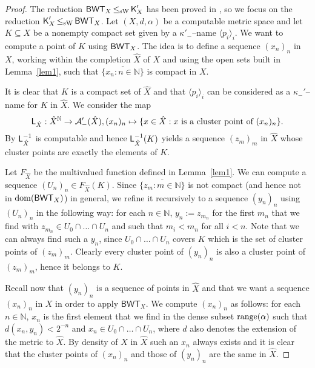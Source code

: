 \documentclass[a4paper]{amsart}
\def\AA{{\mathcal A}}
\def\IN{{\mathbb{N}}}
\def\dom{{\rm dom}}
\def\range{{\rm range}}
\def\BWT{\text{\rm\sffamily BWT}}
\def\K{\text{\rm\sffamily K}}
\def\L{\text{\rm\sffamily L}}
\def\leqSW{\mathop{\leq_{\mathrm{sW}}}}
\theoremstyle{definition}
\begin{document}
\begin{proof} The reduction $\BWT_X\leqSW\K'_X$ has been proved in \cite{BGM12},
so we focus on the reduction $\K'_X\leqSW\BWT_X$.
Let $(X,d,\alpha)$ be a computable metric space and let $K\subseteq X$ be a nonempty compact set given by a $\kappa'_-$--name $\langle p_i\rangle_i$.
We want to compute a point of $K$ using $\BWT_X$. The idea is to define a sequence $(x_n)_n$ in $X$,
working within the completion $\hat{X}$ of $X$ and using the open sets built in Lemma~\ref{lem1}, such that $\overline{\{x_n:n\in\IN\}}$ is compact in $X$.

It is clear that $K$ is a compact set of $\hat{X}$ and that $\langle p_i\rangle_i$ can be considered as a $\kappa_-'$--name for $K$ in $\hat{X}$.
We consider the map
\[\L_{\hat{X}}:\hat{X}^\IN\to\AA'_-(\hat{X}),(x_n)_n\mapsto\{x\in \hat{X}:\mbox{$x$ is a cluster point of $(x_n)_n$}\}.\]
By \cite[Corollary 9.5]{BGM12} $\L^{-1}_{\hat{X}}$ is computable and hence $\L_{\hat{X}}^{-1}(K)$ yields a sequence
$(z_m)_m$ in $\hat{X}$ whose cluster points are exactly the elements of $K$.

Let $F_{\hat{X}}$ be the multivalued function defined in Lemma~\ref{lem1}. We
can compute a sequence $(U_n)_n\in F_{\hat{X}}(K)$. Since
$\overline{\{z_m:m\in\IN\}}$ is not compact (and hence not in $\dom(\BWT_X)$)
in general, we refine it recursively to a sequence $(y_n)_n$ using $(U_n)_n$
in the following way: for each $n\in\IN$, $y_n:=z_{m_n}$ for the first $m_n$
that we find with $z_{m_n}\in U_0\cap\dots\cap U_n$ and such that $m_i<m_n$
for all $i<n$. Note that we can always find such a $y_n$, since
$U_0\cap\dots\cap U_n$ covers $K$ which is the set of cluster points of
$(z_m)_m$. Clearly every cluster point of $(y_n)_n$ is also a cluster point
of $(z_m)_m$, hence it belongs to $K$.

Recall now that $(y_n)_n$ is a sequence of points in $\hat{X}$ and that we want a sequence $(x_n)_n$ in $X$ in order to apply $\mathsf{BWT}_X$.
We compute $(x_n)_n$ as follows: for each $n\in\IN$, $x_n$ is the first element that we find in the dense subset $\range(\alpha)$ such that $d(x_n,y_n)<2^{-n}$
and $x_n\in U_0\cap\dots\cap U_n$, where $d$ also denotes the extension of the metric to $\hat{X}$.
By density of $X$ in $\hat{X}$ such an $x_n$ always exists and it is clear that the cluster points of $(x_n)_n$ and those of $(y_n)_n$ are the same in $\hat{X}$.


\end{proof}
\end{document}
